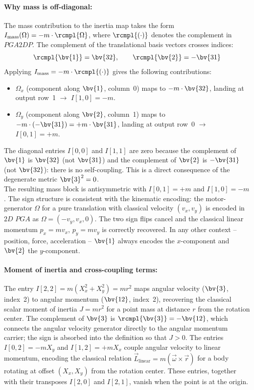 \paragraph{Why mass is off-diagonal:} The mass contribution to the inertia map takes the
form
$I_\mathrm{mass}(\Omega) = -m \cdot \rcmpl{\Omega}$, where $\rcmpl{(\cdot)}$ denotes the
complement in $PGA2DP$. The complement of the translational basis vectors crosses indices:
\begin{equation}
    \rcmpl{\bv{1}} = \bv{32}, \qquad \rcmpl{\bv{2}} = -\bv{31}
    \label{eq:dual_pga2dp}
\end{equation}
Applying $I_\mathrm{mass} = -m \cdot \rcmpl{(\cdot)}$ gives the following contributions:
\begin{itemize}
    \item $\Omega_x$ (component along $\bv{1}$, column~0) maps to $-m \cdot \bv{32}$,
    landing at output row~1 $\rightarrow$ $I[1,0] = -m$.
    \item $\Omega_y$ (component along $\bv{2}$, column~1) maps to $-m \cdot (-\bv{31})
    = +m \cdot \bv{31}$, landing at output row~0 $\rightarrow$ $I[0,1] = +m$.
\end{itemize}
The diagonal entries $I[0,0]$ and $I[1,1]$ are zero because the complement of $\bv{1}$ is
$\bv{32}$ (not $\bv{31}$) and the complement of $\bv{2}$ is $-\bv{31}$ (not $\bv{32}$):
there is no self-coupling. This is a direct consequence of the degenerate metric $\bv{3}^2
= 0$. \\

The resulting mass block is antisymmetric with $I[0,1] = +m$ and $I[1,0] = -m$. The sign
structure is consistent with the kinematic encoding: the motor-generator $\Omega$ for a
pure translation with classical velocity $(v_x, v_y)$ is encoded in $2D$ $PGA$ as $\Omega
= (-v_y, v_x, 0)$. The two sign flips cancel and the classical linear momentum $p_x =
mv_x$, $p_y = mv_y$ is correctly recovered. In any other context -- position, force,
acceleration -- $\bv{1}$ always encodes the $x$-component and $\bv{2}$ the $y$-component.

\paragraph{Moment of inertia and cross-coupling terms:} The entry $I[2,2] = m(X_x^2 +
X_y^2) =
mr^2$ maps angular velocity ($\bv{3}$, index~2) to angular momentum ($\bv{12}$, index~2),
recovering the classical scalar moment of inertia $J = mr^2$ for a point mass at distance
$r$ from the rotation center. The complement of $\bv{3}$ is $\rcmpl{\bv{3}} = -\bv{12}$,
which connects the angular velocity generator directly to the angular momentum carrier;
the sign is absorbed into the definition so that $J > 0$. The entries $I[0,2] = -mX_y$ and
$I[1,2] = +mX_x$ couple angular velocity to linear momentum, encoding the classical
relation $\vec{L}_\mathrm{linear} = m(\vec{\omega} \times \vec{r})$ for a body rotating at
offset $(X_x, X_y)$ from the rotation center. These entries, together with their
transposes $I[2,0]$ and $I[2,1]$, vanish when the point is at the origin.

